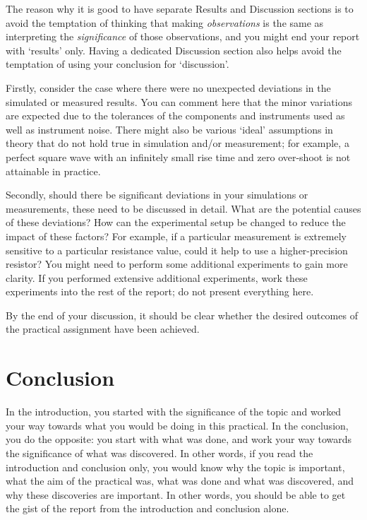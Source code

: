 \documentclass[a4paper, onecolumn, 12pt]{IEEEtran}
\begin{document}
The reason why it is good to have separate Results and Discussion sections is to avoid the temptation of thinking that making \textit{observations} is the same as interpreting the \textit{significance} of those observations, and you might end your report with `results' only. Having a dedicated Discussion section also helps avoid the temptation of using your conclusion for `discussion'.

Firstly, consider the case where there were no unexpected deviations in the simulated or measured results. You can comment here that the minor variations are expected due to the tolerances of the components and instruments used as well as instrument noise. There might also be various `ideal' assumptions in theory that do not hold true in simulation and/or measurement; for example, a perfect square wave with an infinitely small rise time and zero over-shoot is not attainable in practice.

Secondly, should there be significant deviations in your simulations or measurements, these need to be discussed in detail. What are the potential causes of these deviations? How can the experimental setup be changed to reduce the impact of these factors? For example, if a particular measurement is extremely sensitive to a particular resistance value, could it help to use a higher-precision resistor? You might need to perform some additional experiments to gain more clarity. If you performed extensive additional experiments, work these experiments into the rest of the report; do not present everything here.

By the end of your discussion, it should be clear whether the desired outcomes of the practical assignment have been achieved.


\section{Conclusion}
\label{sec:conclusion}

In the introduction, you started with the significance of the topic and worked your way towards what you would be doing in this practical. In the conclusion, you do the opposite: you start with what was done, and work your way towards the significance of what was discovered. In other words, if you read the introduction and conclusion only, you would know why the topic is important, what the aim of the practical was, what was done and what was discovered, and why these discoveries are important. In other words, you should be able to get the gist of the report from the introduction and conclusion alone.
\end{document}
